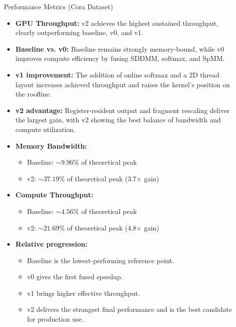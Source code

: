 \documentclass[final]{beamer}
\newlength{\sepwidth}
\newlength{\colwidth}
\newcommand{\separatorcolumn}{\begin{column}{\sepwidth}\end{column}}
\begin{document}
\begin{frame}[t]
\begin{columns}[t]
\begin{column}{\colwidth}
\begin{block}{Performance Metrics (Cora Dataset)}
    \begin{itemize}
      \item \textbf{GPU Throughput:} v2 achieves the highest sustained throughput, clearly outperforming baseline, v0, and v1.
      \item \textbf{Baseline vs. v0:} Baseline remains strongly memory-bound, while v0 improves compute efficiency by fusing SDDMM, softmax, and SpMM.
      \item \textbf{v1 improvement:} The addition of online softmax and a 2D thread layout increases achieved throughput and raises the kernel's position on the roofline.
      \item \textbf{v2 advantage:} Register-resident output and fragment rescaling deliver the largest gain, with v2 showing the best balance of bandwidth and compute utilization.
      \item \textbf{Memory Bandwidth:} 
      \begin{itemize}
        \item Baseline: $\sim 9.96\%$ of theoretical peak
        \item v2: $\sim 37.19\%$ of theoretical peak (3.7× gain)
      \end{itemize}
      \item \textbf{Compute Throughput:}
      \begin{itemize}
        \item Baseline: $\sim 4.56\%$ of theoretical peak
        \item v2: $\sim 21.69\%$ of theoretical peak (4.8× gain)
      \end{itemize}
      \item \textbf{Relative progression:} 
      \begin{itemize}
        \item Baseline is the lowest-performing reference point.
        \item v0 gives the first fused speedup.
        \item v1 brings higher effective throughput.
        \item v2 delivers the strongest final performance and is the best candidate for production use.
      \end{itemize}
    \end{itemize}

  \end{block}

\end{column}

\separatorcolumn


\end{columns}
\end{frame}
\end{document}
